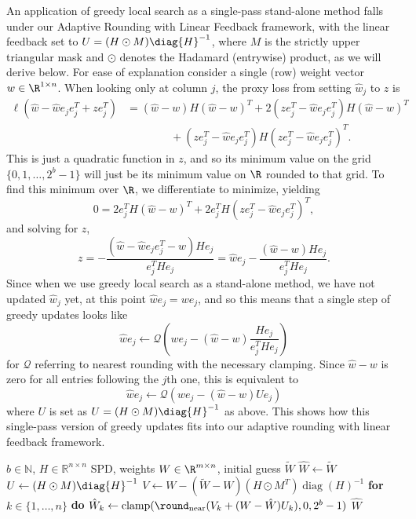 An application of greedy local search as a single-pass stand-alone method falls under our Adaptive Rounding with Linear Feedback framework, with the linear feedback set to $U = (H \odot M) \diag{H}^{-1}$, where $M$ is the strictly upper triangular mask and $\odot$ denotes the Hadamard (entrywise) product, as we will derive below.
For ease of explanation consider a single (row) weight vector $w \in \R^{1 \times n}$.
When looking only at column $j$, the proxy loss from setting $\hat w_j$ to $z$ is
\begin{align*}
    \ell(\hat w - \hat w e_j e_j^T + z e_j^T) 
    &= 
    (\hat w - w) H (\hat w - w)^T
    +
    2 (z e_j^T - \hat w e_j e_j^T) H (\hat w - w)^T
    \\&\hspace{4em}+
    (z e_j^T - \hat w e_j e_j^T) H (z e_j^T - \hat w e_j e_j^T)^T.
\end{align*}
This is just a quadratic function in $z$, and so its minimum value on the grid $\{0, 1, \ldots, 2^{b} - 1\}$ will just be its minimum value on $\R$ rounded to that grid.
To find this minimum over $\R$, we differentiate to minimize, yielding
\[
    0
    =
    2 e_j^T H (\hat w - w)^T
    +
    2 e_j^T H (z e_j^T - \hat w e_j e_j^T)^T,
\]
and solving for $z$,
\begin{equation}
    \label{eqnGreedyZ}
    z
    =
    -
    \frac{
        (\hat w - \hat w e_j e_j^T - w) H e_j
    }{
        e_j^T H e_j
    }
    =
    \hat w e_j
    -
    \frac{
        (\hat w - w) H e_j
    }{
        e_j^T H e_j
    }.
\end{equation}
Since when we use greedy local search as a stand-alone method, we have not updated $\hat w_j$ yet, at this point $\hat w e_j = w e_j$, and so
this means that a single step of greedy updates looks like
\[
    \hat w e_j \gets \mathcal{Q}\left( w e_j - (\hat w - w) \frac{
        H e_j
    }{
        e_j^T H e_j
    } \right)
\]
for $\mathcal{Q}$ referring to nearest rounding with the necessary clamping. Since $\hat w - w$ is zero for all entries following the $j$th one, this is equivalent to 
\[
    \hat w e_j \gets \mathcal{Q}( w e_j - (\hat w - w) U e_j )
\]
where $U$ is set as $U = (H \odot M) \diag{H}^{-1}$ as above.
This shows how this single-pass version of greedy updates fits into our adaptive rounding with linear feedback framework.


\begin{algorithm}[t]
\caption{Greedy Updates: A Single Pass}\label{algSuppGreedy}
\begin{algorithmic}[1]
\Require $b \in \mathbb{N}$, $H \in \mathbb{R}^{n \times n}$ SPD, weights $W \in \R^{m \times n}$, initial guess $\tilde W$
\State $\hat W \gets \tilde W$
\State $U \gets (H \odot M) \diag{H}^{-1}$ 
\State $V \gets W - (\tilde W - W) (H \odot M^T) \operatorname{diag}(H)^{-1}$ 
\State \textbf{for} $k \in \{1, \dots, n\}$ \textbf{do}  
$\hat W_k \gets \operatorname{clamp}(\round_{\operatorname{near}}( V_k + (W - \hat W) U_k ), 0, 2^b-1)$
\State \Return $\hat W$ 
\end{algorithmic}
\end{algorithm}

